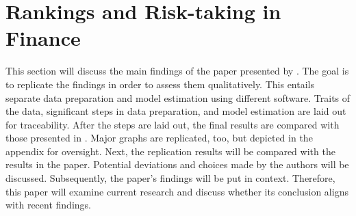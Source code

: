 \documentclass[12pt]{article}
\begin{document}
\section{Rankings and Risk-taking in Finance} \label{section:rankings}
This section will discuss the main findings of the paper presented by \textcite{Kirchler2018}. The goal is to replicate the findings in order to assess them qualitatively. This entails separate data preparation and model estimation using different software.
Traits of the data, significant steps in data preparation, and model estimation are laid out for traceability. After the steps are laid out, the final results are compared with those presented in \textcite{Kirchler2018}. Major graphs are replicated, too, but depicted in the appendix for oversight.
Next, the replication results will be compared with the results in the paper. Potential deviations and choices made by the authors will be discussed. Subsequently, the paper's findings will be put in context. Therefore, this paper will examine current research and discuss whether its conclusion aligns with recent findings.
\end{document}
